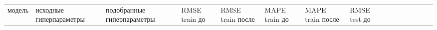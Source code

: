 \documentclass[11pt]{article}
\newcounter{none}
\begin{document}
{\def\LTcaptype{none} %
\begin{longtable}[]{@{}
  >{\raggedright\arraybackslash}p{}
  >{\raggedright\arraybackslash}p{}
  >{\raggedright\arraybackslash}p{}
  >{\raggedleft\arraybackslash}p{}
  >{\raggedleft\arraybackslash}p{}
  >{\raggedleft\arraybackslash}p{}
  >{\raggedleft\arraybackslash}p{}
  >{\raggedleft\arraybackslash}p{}
  >{\raggedleft\arraybackslash}p{}
  >{\raggedleft\arraybackslash}p{}
  >{\raggedleft\arraybackslash}p{}
  >{\raggedleft\arraybackslash}p{}
  >{\raggedleft\arraybackslash}p{}
  >{\raggedleft\arraybackslash}p{}
  >{\raggedleft\arraybackslash}p{}@{}}
\toprule\noalign{}
\begin{minipage}[b]{\linewidth}\raggedright
модель
\end{minipage} & \begin{minipage}[b]{\linewidth}\raggedright
исходные гиперпараметры
\end{minipage} & \begin{minipage}[b]{\linewidth}\raggedright
подобранные гиперпараметры
\end{minipage} & \begin{minipage}[b]{\linewidth}\raggedleft
RMSE train до
\end{minipage} & \begin{minipage}[b]{\linewidth}\raggedleft
RMSE train после
\end{minipage} & \begin{minipage}[b]{\linewidth}\raggedleft
MAPE train до
\end{minipage} & \begin{minipage}[b]{\linewidth}\raggedleft
MAPE train после
\end{minipage} & \begin{minipage}[b]{\linewidth}\raggedleft
RMSE test до
\end{minipage} & \begin{minipage}[b]{\linewidth}\raggedleft

\end{minipage}
\end{longtable}}
\end{document}
